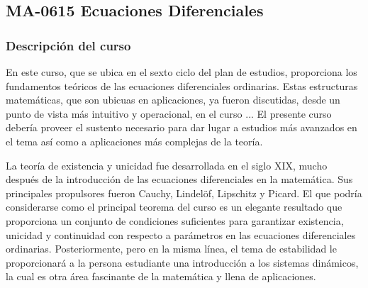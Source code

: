 \newpage
\subsection*{MA-0615 Ecuaciones Diferenciales}

\begin{refsection}


\begin{table}[H]
\end{table} 


\subsubsection*{Descripción del curso}

En este curso, que se ubica en el sexto ciclo del plan de estudios, proporciona los fundamentos teóricos de las ecuaciones diferenciales ordinarias. Estas estructuras matemáticas, que son ubicuas en aplicaciones, ya fueron discutidas, desde un punto de vista más intuitivo y operacional, en el curso ... El presente curso debería proveer el sustento necesario para dar lugar a estudios más avanzados en el tema así como a aplicaciones más complejas de la teoría. 

La teoría de existencia y unicidad fue desarrollada en el siglo XIX, mucho después de la introducción de las ecuaciones diferenciales en la matemática. Sus principales propulsores fueron Cauchy, Lindelöf, Lipschitz y Picard. El que podría considerarse como el principal teorema del curso es un elegante resultado que proporciona un conjunto de condiciones suficientes para garantizar existencia, unicidad y continuidad con respecto a parámetros en las ecuaciones diferenciales ordinarias. Posteriormente, pero en la misma línea, el tema de estabilidad le proporcionará a la persona estudiante una introducción a los sistemas dinámicos, la cual es otra área fascinante de la matemática y llena de aplicaciones.


\end{refsection}
